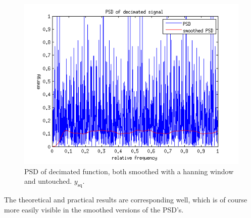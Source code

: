\documentclass[10pt]{article}
\begin{document}
\begin{figure}[!hp]
    \begin{center}
      \includegraphics[width=1\textwidth]{ideal_periodogram_hanning_decimated}
    \caption{PSD of decimated function, both smoothed with a hanning window and untouched. $y_\text{sq}$. \label{fig:TheoACFsimple}}
    \end{center}
\end{figure}

The theoretical and practical results are corresponding well, which is of course more easily visible in the smoothed versions of the PSD's.
\end{document}
